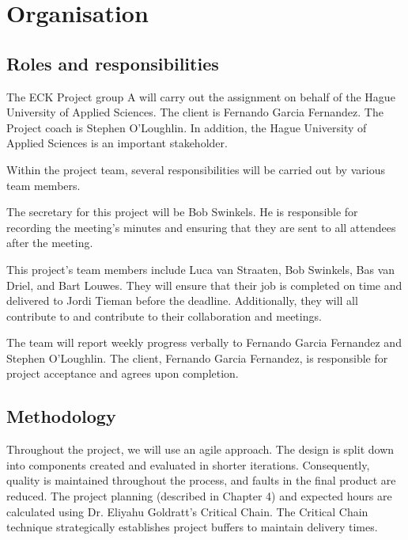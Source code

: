 \chapter{Organisation}

\section{Roles and responsibilities}

The ECK Project group A will carry out the assignment on behalf of the Hague University of Applied Sciences. The client is Fernando Garcia Fernandez. The Project coach is Stephen O'Loughlin. In addition, the Hague University of Applied Sciences is an important stakeholder. 

Within the project team, several responsibilities will be carried out by various team members.


The secretary for this project will be Bob Swinkels. He is responsible for recording the meeting's minutes and ensuring that they are sent to all attendees after the meeting.

This project's team members include Luca van Straaten, Bob Swinkels, Bas van Driel, and Bart Louwes. They will ensure that their job is completed on time and delivered to Jordi Tieman before the deadline. Additionally, they will all contribute to and contribute to their collaboration and meetings.

The team will report weekly progress verbally to Fernando Garcia Fernandez and Stephen O'Loughlin. 
The client, Fernando Garcia Fernandez, is responsible for project acceptance and agrees upon completion.

\section{Methodology}

Throughout the project, we will use an agile approach. The design is split down into components created and evaluated in shorter iterations. Consequently, quality is maintained throughout the process, and faults in the final product are reduced.
The project planning (described in Chapter 4) and expected hours are calculated using Dr. Eliyahu Goldratt's Critical Chain. The Critical Chain technique strategically establishes project buffers to maintain delivery times.

